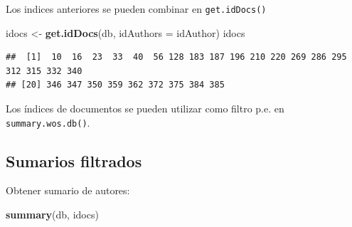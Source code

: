 \documentclass[
]{book}
\newenvironment{Shaded}{\begin{snugshade}}{\end{snugshade}}
\newcommand{\AttributeTok}[1]{\textcolor[rgb]{0.13,0.29,0.53}{#1}}
\newcommand{\FunctionTok}[1]{\textcolor[rgb]{0.13,0.29,0.53}{\textbf{#1}}}
\newcommand{\NormalTok}[1]{#1}
\newcommand{\OtherTok}[1]{\textcolor[rgb]{0.56,0.35,0.01}{#1}}
\begin{document}
Los indices anteriores se pueden combinar en \texttt{get.idDocs()}

\begin{Shaded}
\begin{Highlighting}[]
\NormalTok{idocs }\OtherTok{\textless{}{-}} \FunctionTok{get.idDocs}\NormalTok{(db, }\AttributeTok{idAuthors =}\NormalTok{ idAuthor)}
\NormalTok{idocs}
\end{Highlighting}
\end{Shaded}

\begin{verbatim}
##  [1]  10  16  23  33  40  56 128 183 187 196 210 220 269 286 295 312 315 332 340
## [20] 346 347 350 359 362 372 375 384 385
\end{verbatim}

Los índices de documentos se pueden utilizar como filtro p.e. en \texttt{summary.wos.db()}.

\hypertarget{sumarios-filtrados}{%
\subsection{Sumarios filtrados}\label{sumarios-filtrados}}

Obtener sumario de autores:

\begin{Shaded}
\begin{Highlighting}[]
\FunctionTok{summary}\NormalTok{(db, idocs)}
\end{Highlighting}
\end{Shaded}
\end{document}
